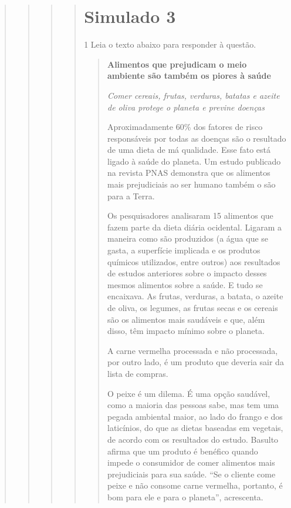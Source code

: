 \begin{quote}
\begin{quote}
\begin{quote}
\begin{quote}
\begin{escolha}
\end{escolha}


\chapter{Simulado 3}

\num{1} Leia o texto abaixo para responder à questão. 

\begin{quote}

\textbf{Alimentos que prejudicam o meio ambiente são também os piores à
saúde}

\textit{Comer cereais, frutas, verduras, batatas e azeite de oliva protege o
planeta e previne doenças}

Aproximadamente 60\% dos fatores de risco responsáveis por todas as
doenças são o resultado de uma dieta de má qualidade. Esse fato está
ligado à saúde do planeta. Um estudo publicado na revista PNAS demonstra
que os alimentos mais prejudiciais ao ser humano também o são para a
Terra.

Os pesquisadores analisaram 15 alimentos que fazem parte da dieta diária
ocidental. Ligaram a maneira como são produzidos (a água que se gasta, a
superfície implicada e os produtos químicos utilizados, entre outros)
aos resultados de estudos anteriores sobre o impacto desses mesmos
alimentos sobre a saúde. E tudo se encaixava. As frutas, verduras, a
batata, o azeite de oliva, os legumes, as frutas secas e os cereais são
os alimentos mais saudáveis e que, além disso, têm impacto mínimo sobre
o planeta.

A carne vermelha processada e não processada, por outro lado, é um
produto que deveria sair da lista de compras.

O peixe é um dilema. É uma opção saudável, como a maioria das pessoas
sabe, mas tem uma pegada ambiental maior, ao lado do frango e dos
laticínios, do que as dietas baseadas em vegetais, de acordo com os
resultados do estudo. Basulto afirma que um produto é benéfico quando
impede o consumidor de comer alimentos mais prejudiciais para sua saúde.
``Se o cliente come peixe e não consome carne vermelha, portanto, é bom
para ele e para o planeta'', acrescenta.


\end{quote}
\end{quote}
\end{quote}
\end{quote}
\end{quote}
